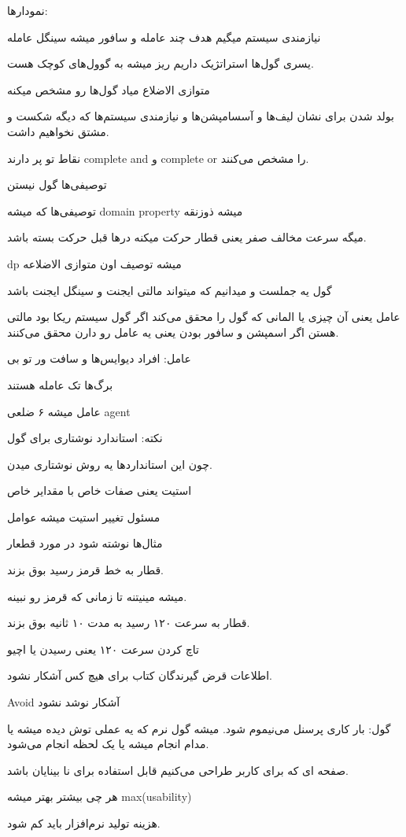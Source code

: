 نمودار‌ها:

نیازمندی سیستم میگیم هدف چند عامله
و سافور میشه سینگل عامله

یسری گول‌ها استراتژیک داریم ریز میشه به گوول‌های کوچک هست.

متوازی الاضلاع میاد گول‌ها رو مشخص میکنه

بولد شدن برای نشان لیف‌ها و آسسامپشن‌ها و نیازمندی سیستم‌ها که دیگه شکست و مشتق
نخواهیم داشت.

نقاط تو پر دارند complete and و complete or را مشخص می‌کنند.

توصیفی‌ها گول نیستن

توصیفی‌ها که میشه domain property میشه ذوزنقه

میگه سرعت مخالف صفر یعنی قطار حرکت میکنه در‌ها قبل حرکت بسته باشد.

dp میشه توصیف اون متوازی الاضلاعه

گول یه جملست و میدانیم که میتواند مالتی ایجنت و سینگل ایجنت باشد

عامل یعنی آن چیزی یا المانی که گول را محقق می‌کند
اگر گول سیستم ریکا بود مالتی هستن
اگر اسمپشن و سافور بودن یعنی یه عامل رو دارن محقق می‌کنند.

عامل: افراد دیوایس‌ها و سافت ور تو بی

برگ‌ها تک عامله هستند

عامل میشه ۶ ضلعی agent

نکته: استاندارد نوشتاری برای گول

چون این استاندارد‌ها یه روش نوشتاری میدن.

استیت یعنی صفات خاص با مقدایر خاص

مسئول تغییر استیت میشه عوامل

مثال‌ها نوشته شود در مورد قطعار

قطار به خط قرمز رسید بوق بزند.

میشه مینیتنه تا زمانی که قرمز رو نبینه.

قطار به سرعت ۱۲۰ رسید به مدت ۱۰ ثانیه بوق بزند.

تاچ کردن سرعت ۱۲۰ یعنی رسیدن یا اچیو

اطلاعات قرض گیرندگان کتاب برای هیچ کس آشکار نشود.

Avoid آشکار نوشد نشود

گول: بار کاری پرسنل می‌نیموم شود.
میشه گول نرم
که یه عملی توش دیده میشه
یا مدام انجام میشه
یا یک لحظه انجام می‌شود.

صفحه ای که برای کاربر طراحی می‌کنیم قابل استفاده برای نا بینایان باشد.

هر چی بیشتر بهتر میشه max(usability)

هزینه تولید نرم‌افزار باید کم شود.

